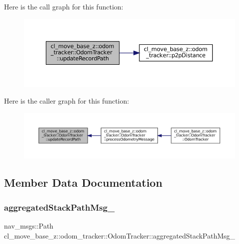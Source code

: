 Here is the call graph for this function\+:
\nopagebreak
\begin{figure}[H]
\begin{center}
\leavevmode
\includegraphics[width=350pt]{classcl__move__base__z_1_1odom__tracker_1_1OdomTracker_a77a66083573c6bef726d77447fb53349_cgraph}
\end{center}
\end{figure}
Here is the caller graph for this function\+:
\nopagebreak
\begin{figure}[H]
\begin{center}
\leavevmode
\includegraphics[width=350pt]{classcl__move__base__z_1_1odom__tracker_1_1OdomTracker_a77a66083573c6bef726d77447fb53349_icgraph}
\end{center}
\end{figure}


\subsection{Member Data Documentation}
\mbox{\label{classcl__move__base__z_1_1odom__tracker_1_1OdomTracker_a0fb60113ace2791a1f1bbeed59946404}} 
\subsubsection{\texorpdfstring{aggregated\+Stack\+Path\+Msg\+\_\+}{aggregatedStackPathMsg\_}}
{\footnotesize\ttfamily nav\+\_\+msgs\+::\+Path cl\+\_\+move\+\_\+base\+\_\+z\+::odom\+\_\+tracker\+::\+Odom\+Tracker\+::aggregated\+Stack\+Path\+Msg\+\_\+\hspace{0.3cm}{\ttfamily [protected]}}



